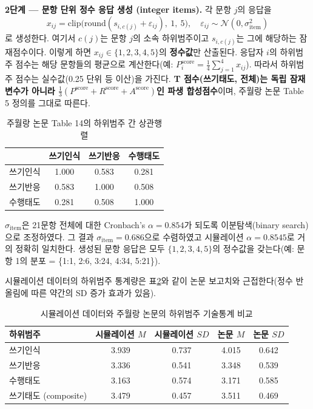 \documentclass[11pt]{article}
\begin{document}
\textbf{2단계 — 문항 단위 정수 응답 생성 (integer items).} 각 문항 $j$의 응답을
\begin{equation}
x_{ij} = \mathrm{clip}\bigl(\mathrm{round}(s_{i,c(j)} + \varepsilon_{ij}),\ 1,\ 5\bigr),
\quad \varepsilon_{ij} \sim \mathcal{N}(0, \sigma_{\mathrm{item}}^2)
\end{equation}
로 생성한다. 여기서 $c(j)$는 문항 $j$의 소속 하위범주이고 $s_{i,c(j)}$는 그에 해당하는 잠재점수이다. 이렇게 하면 $x_{ij} \in \{1,2,3,4,5\}$의 \textbf{정수값}만 산출된다. 응답자 $i$의 하위범주 점수는 해당 문항들의 평균으로 계산한다(예: $P_i^{\text{score}} = \tfrac{1}{4}\sum_{j=1}^{4} x_{ij}$). 따라서 하위범주 점수는 실수값(0.25 단위 등 이산)을 가진다. \textbf{T 점수(쓰기태도, 전체)는 독립 잠재변수가 아니라 $\tfrac{1}{3}(P^{\text{score}}+R^{\text{score}}+A^{\text{score}})$인 파생 합성점수}이며, 주월랑 논문 Table 5 정의를 그대로 따른다.

\begin{table}[h]
\centering
\caption{주월랑 논문 Table 14의 하위범주 간 상관행렬}\label{tab:corr}
\begin{tabular}{lccc}
\toprule
 & 쓰기인식 & 쓰기반응 & 수행태도 \\
\midrule
쓰기인식 & 1.000 & 0.583 & 0.281 \\
쓰기반응 & 0.583 & 1.000 & 0.508 \\
수행태도 & 0.281 & 0.508 & 1.000 \\
\bottomrule
\end{tabular}
\end{table}

$\sigma_{\text{item}}$은 21문항 전체에 대한 Cronbach's $\alpha = 0.854$가 되도록 이분탐색(binary search)으로 조정하였다. 그 결과 $\sigma_{\text{item}} = 0.686$으로 수렴하였고 시뮬레이션 $\alpha = 0.8545$로 거의 정확히 일치한다. 생성된 문항 응답은 모두 $\{1, 2, 3, 4, 5\}$의 정수값을 갖는다(예: 문항 1의 분포 = \{1:1, 2:6, 3:24, 4:34, 5:21\}).

시뮬레이션 데이터의 하위범주 통계량은 표\ref{tab:sim_desc}와 같이 논문 보고치와 근접한다(정수 반올림에 따른 약간의 SD 증가 효과가 있음).

\begin{table}[h]
\centering
\caption{시뮬레이션 데이터와 주월랑 논문의 하위범주 기술통계 비교}\label{tab:sim_desc}
\begin{tabular}{lcccc}
\toprule
하위범주 & 시뮬레이션 $M$ & 시뮬레이션 $SD$ & 논문 $M$ & 논문 $SD$ \\
\midrule
쓰기인식 & 3.939 & 0.737 & 4.015 & 0.642 \\
쓰기반응 & 3.336 & 0.541 & 3.348 & 0.539 \\
수행태도 & 3.163 & 0.574 & 3.171 & 0.585 \\
쓰기태도 (composite) & 3.479 & 0.457 & 3.511 & 0.469 \\
\bottomrule
\end{tabular}
\end{table}
\end{document}
